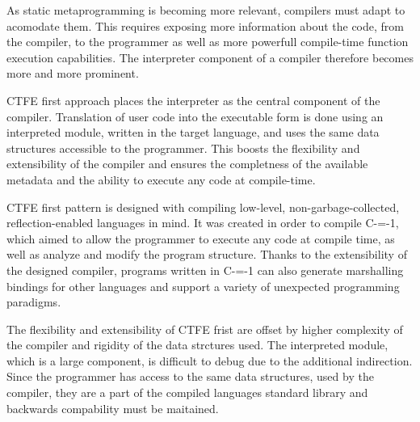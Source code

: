 As static metaprogramming is becoming more relevant, compilers must adapt to acomodate them.
This requires exposing more information about the code, from the compiler, to the programmer as well as more powerfull compile-time function execution capabilities.
The interpreter component of a compiler therefore becomes more and more prominent.

CTFE first approach places the interpreter as the central component of the compiler.
Translation of user code into the executable form is done using an interpreted module, written in the target language, and uses the same data structures accessible to the programmer.
This boosts the flexibility and extensibility of the compiler and ensures the completness of the available metadata and the ability to execute any code at compile-time.

CTFE first pattern is designed with compiling low-level, non-garbage-collected, reflection-enabled languages in mind.
It was created in order to compile C-=-1, which aimed to allow the programmer to execute any code at compile time, as well as analyze and modify the program structure.
Thanks to the extensibility of the designed compiler, programs written in C-=-1 can also generate marshalling bindings for other languages and support a variety of unexpected programming paradigms.

The flexibility and extensibility of CTFE frist are offset by higher complexity of the compiler and rigidity of the data strctures used.
The interpreted module, which is a large component, is difficult to debug due to the additional indirection.
Since the programmer has access to the same data structures, used by the compiler, they are a part of the compiled languages standard library and backwards compability must be maitained.
